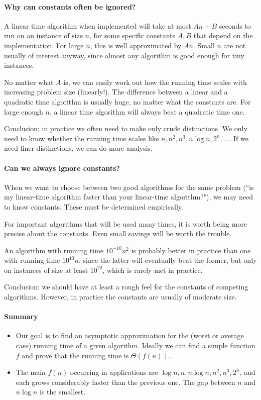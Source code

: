 \paragraph{Why can constants often be ignored?}

A linear time algorithm when implemented will take at most $A
n + B$ seconds to run on an instance of size $n$, for some
specific constants $A, B$ that depend on the implementation. For large $n$, this is well approximated by $A n$. 
Small $n$ are not usually of interest anyway, since almost any algorithm is good
 enough for tiny instances. 
 
No matter what $A$ is, we can easily work out how the running time
scales with increasing problem size (linearly!). The difference between a linear and a quadratic time algorithm is
usually huge, no matter what the constants are. For large enough $n$, a
linear time algorithm will always beat a quadratic time one. 

Conclusion: in practice we often need to make only crude
distinctions. We only need to know whether the running time scales like 
$n, n^2, n^3, n \log n, 2^n, \dots$. If we need finer distinctions, we 
can do more analysis.



\paragraph{Can we always ignore constants?}

When we want to choose between two good algorithms for the same
problem (``is my linear-time algorithm faster than your linear-time
algorithm?"), we may need to know constants. These must be determined
empirically. 

For important algorithms that will be used many times, it is worth
being more precise about the constants. Even small savings will be worth
the trouble. 

An algorithm with running time $10^{-10} n^2$ is probably better
in practice than one with running time $10^{10} n$, since the latter
will eventually beat the former, but only on instances of size at least $10^{20}$, 
which is rarely met in practice. 

Conclusion: we should have at least a rough feel for the constants
of competing algorithms. However, in practice the constants are usually
of moderate size. 



\paragraph{Summary}
\begin{itemize}
\item Our goal is to find an asymptotic approximation for the (worst or average 
case) running time of a given algorithm. Ideally we can find a simple function 
$f$ and prove that the running time is $\Theta(f(n))$.
\item The main $f(n)$ occurring in applications are $\log n, n, n \log n, n^2, n^3, 2^n$, and 
each grows considerably faster than the previous one. The gap between $n$ and 
$n\log n$ is the smallest.
\end{itemize}